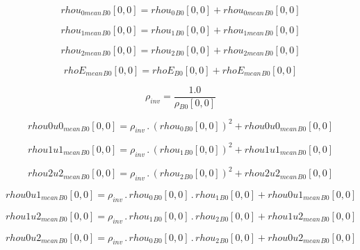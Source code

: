\documentclass{article}
\begin{document}
\begin{dmath}{rhou_{0 mean}{_{B0}}}[{0,0}] = {rhou_{0}{_{B0}}}[{0,0}] + {rhou_{0 mean}{_{B0}}}[{0,0}]\end{dmath}

\begin{dmath}{rhou_{1 mean}{_{B0}}}[{0,0}] = {rhou_{1}{_{B0}}}[{0,0}] + {rhou_{1 mean}{_{B0}}}[{0,0}]\end{dmath}

\begin{dmath}{rhou_{2 mean}{_{B0}}}[{0,0}] = {rhou_{2}{_{B0}}}[{0,0}] + {rhou_{2 mean}{_{B0}}}[{0,0}]\end{dmath}

\begin{dmath}{rhoE_{mean}{_{B0}}}[{0,0}] = {rhoE{_{B0}}}[{0,0}] + {rhoE_{mean}{_{B0}}}[{0,0}]\end{dmath}

\begin{dmath}\rho_{inv} = \frac{1.0}{{\rho{_{B0}}}[{0,0}]}\end{dmath}

\begin{dmath}{rhou0u0_{mean}{_{B0}}}[{0,0}] = \rho_{inv} \,.\, \left({rhou_{0}{_{B0}}}[{0,0}] \right)^{2} + {rhou0u0_{mean}{_{B0}}}[{0,0}]\end{dmath}

\begin{dmath}{rhou1u1_{mean}{_{B0}}}[{0,0}] = \rho_{inv} \,.\, \left({rhou_{1}{_{B0}}}[{0,0}] \right)^{2} + {rhou1u1_{mean}{_{B0}}}[{0,0}]\end{dmath}

\begin{dmath}{rhou2u2_{mean}{_{B0}}}[{0,0}] = \rho_{inv} \,.\, \left({rhou_{2}{_{B0}}}[{0,0}] \right)^{2} + {rhou2u2_{mean}{_{B0}}}[{0,0}]\end{dmath}

\begin{dmath}{rhou0u1_{mean}{_{B0}}}[{0,0}] = \rho_{inv} \,.\, {rhou_{0}{_{B0}}}[{0,0}] \,.\, {rhou_{1}{_{B0}}}[{0,0}] + {rhou0u1_{mean}{_{B0}}}[{0,0}]\end{dmath}

\begin{dmath}{rhou1u2_{mean}{_{B0}}}[{0,0}] = \rho_{inv} \,.\, {rhou_{1}{_{B0}}}[{0,0}] \,.\, {rhou_{2}{_{B0}}}[{0,0}] + {rhou1u2_{mean}{_{B0}}}[{0,0}]\end{dmath}

\begin{dmath}{rhou0u2_{mean}{_{B0}}}[{0,0}] = \rho_{inv} \,.\, {rhou_{0}{_{B0}}}[{0,0}] \,.\, {rhou_{2}{_{B0}}}[{0,0}] + {rhou0u2_{mean}{_{B0}}}[{0,0}]\end{dmath}
\end{document}
